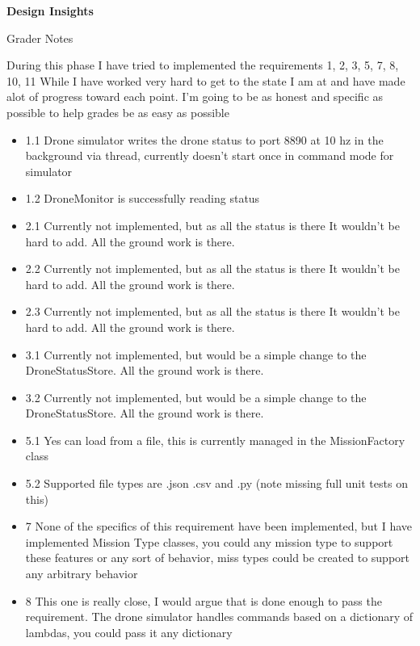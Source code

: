 \documentclass[12pt]{article}
\begin{document}
\begingroup
      \fontsize{14pt}{12pt}\selectfont

      \centerline{\textbf{Design Insights}} \par
\endgroup

Grader Notes

During this phase I have tried to implemented the requirements 1, 2, 3, 5, 7, 8, 10, 11
While I have worked very hard to get to the state I am at and have made alot of progress toward each point.
I'm going to be as honest and specific as possible to help grades be as easy as possible

\begin{itemize}
    \item 1.1 Drone simulator writes the drone status to port 8890 at 10 hz in the background via thread, currently doesn't start once in command mode for simulator
    \item 1.2 DroneMonitor is successfully reading status 
    \item 2.1 Currently not implemented, but as all the status is there It wouldn't be hard to add. All the ground work is there.
    \item 2.2 Currently not implemented, but as all the status is there It wouldn't be hard to add. All the ground work is there.
    \item 2.3 Currently not implemented, but as all the status is there It wouldn't be hard to add. All the ground work is there.
    \item 3.1 Currently not implemented, but would be a simple change to the DroneStatusStore. All the ground work is there.
    \item 3.2 Currently not implemented, but would be a simple change to the DroneStatusStore. All the ground work is there.
    \item 5.1 Yes can load from a file, this is currently managed in the MissionFactory class
    \item 5.2 Supported file types are .json .csv and .py (note missing full unit tests on this)
    \item 7 None of the specifics of this requirement have been implemented, but I have implemented Mission Type classes, you could any mission type to support these features or any sort of behavior, 
     miss  types could be created to support any arbitrary behavior
    \item 8 This one is really close, I would argue that is done enough to pass the requirement. The drone simulator handles commands based on a dictionary of lambdas, you could pass it any dictionary

\end{itemize}
\end{document}
